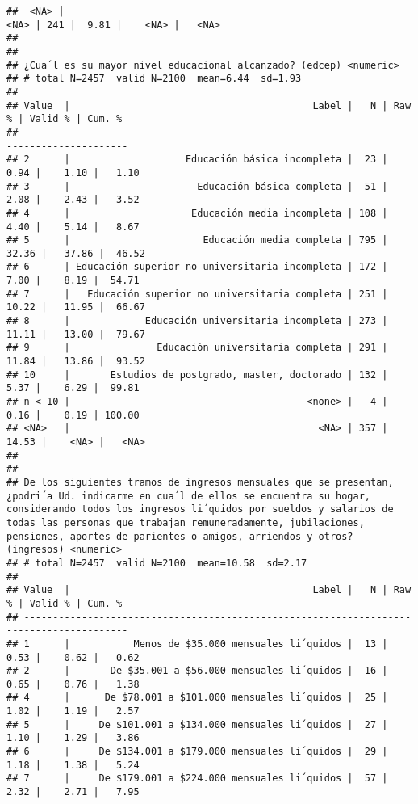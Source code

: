 \documentclass[
  10,
  landscape,
  legalpaper]{article}
\begin{document}
\begin{verbatim}
##  <NA> |                                                                                <NA> | 241 |  9.81 |    <NA> |   <NA>
## 
## 
## ¿Cua´l es su mayor nivel educacional alcanzado? (edcep) <numeric>
## # total N=2457  valid N=2100  mean=6.44  sd=1.93
## 
## Value  |                                          Label |   N | Raw % | Valid % | Cum. %
## ----------------------------------------------------------------------------------------
## 2      |                    Educación básica incompleta |  23 |  0.94 |    1.10 |   1.10
## 3      |                      Educación básica completa |  51 |  2.08 |    2.43 |   3.52
## 4      |                     Educación media incompleta | 108 |  4.40 |    5.14 |   8.67
## 5      |                       Educación media completa | 795 | 32.36 |   37.86 |  46.52
## 6      | Educación superior no universitaria incompleta | 172 |  7.00 |    8.19 |  54.71
## 7      |   Educación superior no universitaria completa | 251 | 10.22 |   11.95 |  66.67
## 8      |             Educación universitaria incompleta | 273 | 11.11 |   13.00 |  79.67
## 9      |               Educación universitaria completa | 291 | 11.84 |   13.86 |  93.52
## 10     |       Estudios de postgrado, master, doctorado | 132 |  5.37 |    6.29 |  99.81
## n < 10 |                                         <none> |   4 |  0.16 |    0.19 | 100.00
## <NA>   |                                           <NA> | 357 | 14.53 |    <NA> |   <NA>
## 
## 
## De los siguientes tramos de ingresos mensuales que se presentan, ¿podri´a Ud. indicarme en cua´l de ellos se encuentra su hogar, considerando todos los ingresos li´quidos por sueldos y salarios de todas las personas que trabajan remuneradamente, jubilaciones, pensiones, aportes de parientes o amigos, arriendos y otros? (ingresos) <numeric>
## # total N=2457  valid N=2100  mean=10.58  sd=2.17
## 
## Value  |                                          Label |   N | Raw % | Valid % | Cum. %
## ----------------------------------------------------------------------------------------
## 1      |           Menos de $35.000 mensuales li´quidos |  13 |  0.53 |    0.62 |   0.62
## 2      |       De $35.001 a $56.000 mensuales li´quidos |  16 |  0.65 |    0.76 |   1.38
## 4      |      De $78.001 a $101.000 mensuales li´quidos |  25 |  1.02 |    1.19 |   2.57
## 5      |     De $101.001 a $134.000 mensuales li´quidos |  27 |  1.10 |    1.29 |   3.86
## 6      |     De $134.001 a $179.000 mensuales li´quidos |  29 |  1.18 |    1.38 |   5.24
## 7      |     De $179.001 a $224.000 mensuales li´quidos |  57 |  2.32 |    2.71 |   7.95

\end{verbatim}
\end{document}
